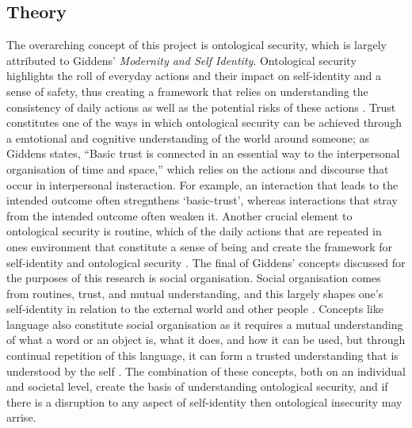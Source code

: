 

\subsection*{Theory}
The overarching concept of this project is ontological security, which is largely attributed to Giddens' \parencite*{giddensModernitySelfidentitySelf2009} \textit{Modernity and Self Identity}. Ontological security highlights the roll of everyday actions and their impact on self-identity and a sense of safety, thus creating a framework that relies on understanding the consistency of daily actions as well as the potential risks of these actions \Parencite[][p. 36]{giddensModernitySelfidentitySelf2009}. Trust constitutes one of the ways in which ontological security can be achieved through a emtotional and cognitive understanding of the world around someone; as Giddens \parencite*[][p. 38]{giddensModernitySelfidentitySelf2009} states, ``Basic trust is connected in an essential way to the interpersonal organisation of time and space,'' which relies on the actions and discourse that occur in interpersonal insteraction. For example, an interaction that leads to the intended outcome often stregnthens `basic-trust', whereas interactions that stray from the intended outcome often weaken it. Another crucial element to ontological security is routine, which of the daily actions that are repeated in ones environment that constitute a sense of being and create the framework for self-identity and ontological security \Parencite[][p. 39-40]{giddensModernitySelfidentitySelf2009}. The final of Giddens' \parencite*[][p. 43]{giddensModernitySelfidentitySelf2009} concepts discussed for the purposes of this research is social organisation. Social organisation comes from routines, trust, and mutual understanding, and this largely shapes one's self-identity in relation to the external world and other people \Parencite[][p. 43-44]{giddensModernitySelfidentitySelf2009}. Concepts like language also constitute social organisation as it requires a mutual understanding of what a word or an object is, what it does, and how it can be used, but through continual repetition of this language, it can form a trusted understanding that is understood by the self \Parencite[][p. 43-45]{giddensModernitySelfidentitySelf2009}. The combination of these concepts, both on an individual and societal level, create the basis of understanding ontological security, and if there is a disruption to any aspect of self-identity then ontological insecurity may arrise.

